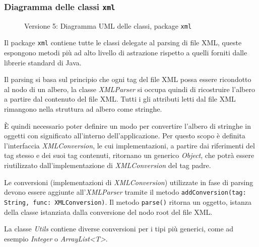 \subsubsection{Diagramma delle classi \texttt{xml}}
\vspace{0.5cm}
\begin{figure}[H]
    \centering
    \caption{Versione 5: Diagramma UML delle classi, package \texttt{xml}}
    \label{fig:class_xml_v_5}
\end{figure}

Il package \texttt{xml} contiene tutte le classi delegate al parsing di file XML, queste espongono metodi più ad alto livello di astrazione rispetto a quelli forniti dalle librerie standard di Java.

Il parsing si basa sul principio che ogni tag del file XML possa essere ricondotto al nodo di un albero,
la classe \textit{XMLParser} si occupa quindi di ricostruire l'albero a partire dal contenuto del file XML.
Tutti i gli attributi letti dal file XML rimangono nella struttura ad albero come stringhe.

È quindi necessario poter definire un modo per convertire l'albero di stringhe in oggetti con significato all'interno dell'applicazione.
Per questo scopo è definita l'interfaccia \textit{XMLConversion}, le cui implementazioni,
a partire dai riferimenti del tag stesso e dei suoi tag contenuti, ritornano un generico \textit{Object}, che potrà essere riutilizzato dall'implementazione di \textit{XMLConversion} del tag padre.

Le conversioni (implementazioni di \textit{XMLConversion}) utilizzate in fase di parsing devono essere aggiunte all'\textit{XMLParser} tramite il metodo \texttt{addConversion(tag: String, func: XMLConversion)}.
Il metodo \texttt{parse()} ritorna un oggetto, istanza della classe istanziata dalla conversione del nodo root del file XML.

La classe \textit{Utils} contiene diverse conversioni per i tipi più generici, come ad esempio \textit{Integer} o \textit{ArrayList<T>}.